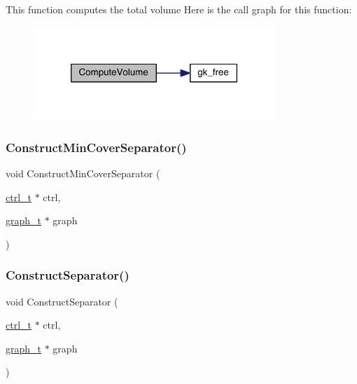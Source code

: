 This function computes the total volume Here is the call graph for this function\+:\nopagebreak
\begin{figure}[H]
\begin{center}
\leavevmode
\includegraphics[width=258pt]{a00945_ae79bf6d99689af2bbe6145846a42e31d_cgraph}
\end{center}
\end{figure}
\mbox{\label{a00945_a3a62c26313cff2772d6241e1d250fe3a}} 
\subsubsection{\texorpdfstring{Construct\+Min\+Cover\+Separator()}{ConstructMinCoverSeparator()}}
{\footnotesize\ttfamily void Construct\+Min\+Cover\+Separator (\begin{DoxyParamCaption}\item[{\hyperlink{a00742}{ctrl\+\_\+t} $\ast$}]{ctrl,  }\item[{\hyperlink{a00734}{graph\+\_\+t} $\ast$}]{graph }\end{DoxyParamCaption})}

\mbox{\label{a00945_a8da060cb6f592f66c7eb2e31af3ecba5}} 
\subsubsection{\texorpdfstring{Construct\+Separator()}{ConstructSeparator()}}
{\footnotesize\ttfamily void Construct\+Separator (\begin{DoxyParamCaption}\item[{\hyperlink{a00742}{ctrl\+\_\+t} $\ast$}]{ctrl,  }\item[{\hyperlink{a00734}{graph\+\_\+t} $\ast$}]{graph }\end{DoxyParamCaption})}


